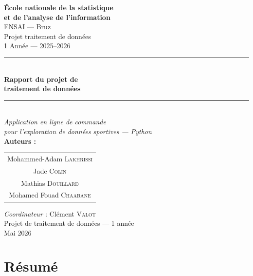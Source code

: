 \documentclass[12pt,a4paper]{article}
\begin{document}
\begin{titlepage}
  \centering
  \vspace*{1.5cm}

  {\LARGE\bfseries École nationale de la statistique\\
  et de l'analyse de l'information}\\[0.3cm]
  {\large ENSAI --- Bruz}\\[0.8cm]

  {\normalsize Projet traitement de données}\\[0.2cm]
  {\normalsize 1\iere{} Année --- 2025--2026}\\[1cm]

  \rule{\linewidth}{1.5pt}\\[0.4cm]
  {\Huge\bfseries\color{NavyBlue} Rapport du projet de\\traitement de données}\\[0.4cm]
  \rule{\linewidth}{1.5pt}\\[1.2cm]

  {\large\itshape Application en ligne de commande\\
  pour l'exploration de données sportives --- Python}\\[2cm]

  \textbf{Auteurs :}\\[0.4cm]
  \begin{tabular}{c}
    Mohammed-Adam \textsc{Lakhrissi} \\[0.15cm]
    Jade \textsc{Colin} \\[0.15cm]
    Mathias \textsc{Douillard} \\[0.15cm]
    Mohamed Fouad \textsc{Chaabane} \\
  \end{tabular}

  \vfill

  {\small \textit{Coordinateur :} Clément \textsc{Valot}\\[0.3cm]
  Projet de traitement de données --- 1\iere{} année\\
  Mai 2026}
\end{titlepage}

\thispagestyle{empty}
\section*{Résumé}
\end{document}
